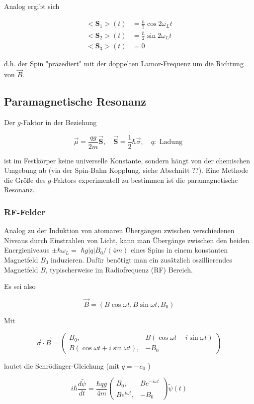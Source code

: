 \documentclass[10pt, letterpaper]{article}
\begin{document}
Analog ergibt sich

$$
\begin{aligned}
<\mathbf{S}_{1}>(t) & =\frac{\hbar}{2} \cos 2 \omega_{L} t \\
<\mathbf{S}_{2}>(t) & =\frac{\hbar}{2} \sin 2 \omega_{L} t \\
<\mathbf{S}_{3}>(t) & =0
\end{aligned}
$$

d.h. der Spin "präzediert" mit der doppelten Lamor-Frequenz um die Richtung von $\vec{B}$.

\subsection*{Paramagnetische Resonanz}
Der $g$-Faktor in der Beziehung

$$
\vec{\mu}=\frac{q g}{2 m} \overrightarrow{\mathbf{S}}, \quad \overrightarrow{\mathbf{S}}=\frac{1}{2} \hbar \vec{\sigma}, \quad q: \text { Ladung }
$$

ist im Festkörper keine universelle Konstante, sondern hängt von der chemischen Umgebung ab (via der Spin-Bahn Kopplung, siehe Abschnitt ??). Eine Methode die Größe des $g$-Faktors experimentell zu bestimmen ist die paramagnetische Resonanz.

\subsubsection*{RF-Felder}
Analog zu der Induktion von atomaren Übergängen zwischen verschiedenen Niveaus durch Einstrahlen von Licht, kann man Übergänge zwischen den beiden Energieniveaus $\pm \hbar \omega_{L}=$ $\hbar g|q| B_{0} /(4 m)$ eines Spins in einem konstanten Magnetfeld $B_{0}$ induzieren. Dafür benötigt man ein zusätzlich oszillierendes Magnetfeld $B$, typischerweise im Radiofrequenz (RF) Bereich.

Es sei also

$$
\vec{B}=\left(B \cos \omega t, B \sin \omega t, B_{0}\right)
$$

Mit

$$
\vec{\sigma} \cdot \vec{B}=\left(\begin{array}{cc}
B_{0}, & B(\cos \omega t-i \sin \omega t) \\
B(\cos \omega t+i \sin \omega t), & -B_{0}
\end{array}\right)
$$

lautet die Schrödinger-Gleichung (mit $q=-e_{0}$ )

$$
i \hbar \frac{d \tilde{\psi}}{d t}=\frac{\hbar q g}{4 m}\left(\begin{array}{cc}
B_{0}, & B e^{-i \omega t} \\
B e^{i \omega t}, & -B_{0}
\end{array}\right) \tilde{\psi}(t)
$$
\end{document}
